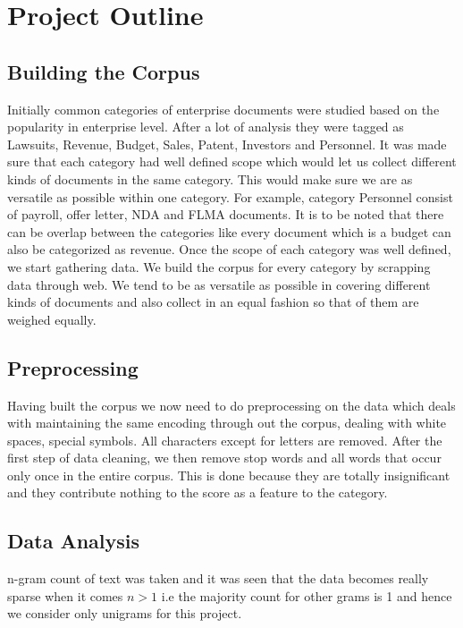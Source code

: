 \documentclass[11pt]{article}
\begin{document}
\section{Project Outline}
\subsection{Building the Corpus}
Initially common categories of enterprise documents were studied based on the popularity in enterprise level.  After a lot of analysis they were tagged as Lawsuits, Revenue, Budget, Sales, Patent, Investors and Personnel.  It was made sure that each category had well defined scope which would let us collect different kinds of documents in the same category. This would make sure we are as versatile as possible within one category. For example, category Personnel consist of payroll, offer letter, NDA and FLMA documents. It is to be noted that there can be overlap between the categories like every document which is a budget can also be categorized as revenue. Once the scope of each category was well defined, we start gathering data. 
We build the corpus for every category by scrapping data through web. We tend to be as versatile as possible in covering different kinds of documents and also collect in an equal fashion so that of them are weighed equally. \\

\subsection{Preprocessing}
Having built the corpus we now need to do preprocessing on the data which deals with maintaining the same encoding through out the corpus, dealing with white spaces, special symbols. All characters except for letters are removed. After the first step of data cleaning, we then remove stop words and all words that occur only once in the entire corpus. This is done because they are totally insignificant and they contribute nothing to the score as a feature to the category. \\

\subsection{Data Analysis}

	n-gram count of text was taken and it was seen that the data becomes really sparse when it comes $n > 1$ i.e the majority count for other grams is 1 and hence we consider only unigrams for this project. \\
	
\end{document}
